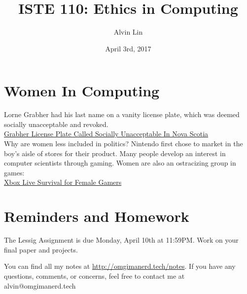 \documentclass[letterpaper, 12pt]{article}
\title{ISTE 110: Ethics in Computing}
\author{Alvin Lin}
\date{April 3rd, 2017}
\begin{document}
\maketitle

\section*{Women In Computing}
Lorne Grabher had his last name on a vanity license plate, which was deemed
socially unacceptable and revoked. \\
\href{http://dailycaller.com/2017/03/25/grabher-license-plate-called-socially-unacceptable-in-nova-scotia/}{Grabher License Plate Called Socially Unacceptable In Nova Scotia} \\
Why are women less included in politics?
Nintendo first chose to market in the boy's aisle of stores for their product.
Many people develop an interest in computer scientists through gaming.
Women are also an ostracizing group in games: \\
\href{https://www.lifewire.com/xbox-live-survival-for-female-gamers-3562487}
{Xbox Live Survival for Female Gamers} \\

\section*{Reminders and Homework}
The Lessig Assignment is due Monday, April 10th at 11:59PM.
Work on your final paper and projects.

\begin{center}
  You can find all my notes at \url{http://omgimanerd.tech/notes}. If you have
  any questions, comments, or concerns, feel free to contact me at
  alvin@omgimanerd.tech
\end{center}
\end{document}
